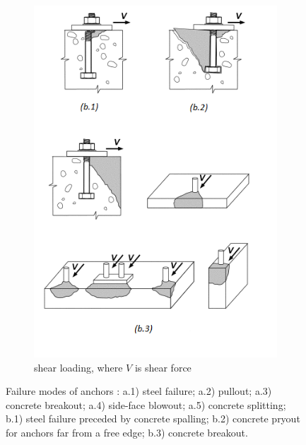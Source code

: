 \begin{figure}
\begin{subfigure}{.5\textwidth}
		\label{obr:tensile_loaded}
	\end{subfigure}%
	\begin{subfigure}{.5\textwidth}
		\centering
		\includegraphics[width=.9\linewidth]{obrazky/failure_models_shear.png}
		\caption{shear loading, where $V$ is shear force}
		\label{obr:shear_loaded}
	\end{subfigure}
	\caption[Failure modes of anchors]{Failure modes of anchors \cite{anchors-ACI-318M}: a.1) steel failure; a.2) pullout; a.3) concrete breakout; a.4) side-face blowout; a.5) concrete splitting; b.1) steel failure preceded by concrete spalling; b.2) concrete pryout for anchors far from a free edge; b.3) concrete breakout.}
	\label{obr:failture_models}
\end{figure}


